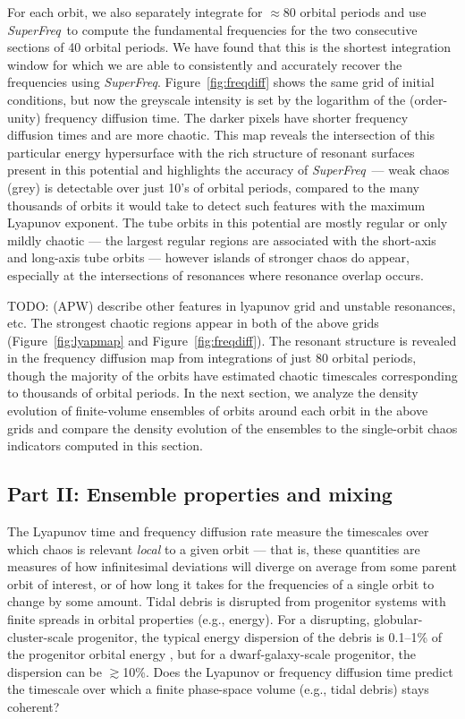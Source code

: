 \documentclass[letterpaper,12pt,preprint]{aastex}
\newcommand{\msun}{\ensuremath{\mathrm{M}_\odot}}
\newcommand{\project}[1]{\textsl{#1}}
\newcommand{\superfreq}{\project{SuperFreq}}
\newcommand{\todo}[2]{{\color{red} TODO: (\MakeUppercase{#1}) #2}}
\begin{document}
For each orbit, we also separately integrate for $\approx$80 orbital periods and use \superfreq\ to compute the fundamental frequencies for the two consecutive sections of 40 orbital periods. We have found that this is the shortest integration window for which we are able to consistently and accurately recover the frequencies using \superfreq. Figure~\ref{fig:freqdiff} shows the same grid of initial conditions, but now the greyscale intensity is set by the logarithm of the (order-unity) frequency diffusion time. The darker pixels have shorter frequency diffusion times and are more chaotic. This map reveals the intersection of this particular energy hypersurface with the rich structure of resonant surfaces present in this potential and highlights the accuracy of \superfreq\ --- weak chaos (grey) is detectable over just 10's of orbital periods, compared to the many thousands of orbits it would take to detect such features with the maximum Lyapunov exponent. The tube orbits in this potential are mostly regular or only mildly chaotic --- the largest regular regions are associated with the short-axis and long-axis tube orbits --- however islands of stronger chaos do appear, especially at the intersections of resonances where resonance overlap occurs. 

\todo{apw}{describe other features in lyapunov grid and unstable resonances, etc.}
The strongest chaotic regions appear in both of the above grids (Figure~\ref{fig:lyapmap} and Figure~\ref{fig:freqdiff}). The resonant structure is revealed in the frequency diffusion map from integrations of just 80 orbital periods, though the majority of the orbits have estimated chaotic timescales corresponding to thousands of orbital periods. In the next section, we analyze the density evolution of finite-volume ensembles of orbits around each orbit in the above grids and compare the density evolution of the ensembles to the single-orbit chaos indicators computed in this section.

\subsection{Part II: Ensemble properties and mixing} \label{sec:results2}

The Lyapunov time and frequency diffusion rate measure the timescales over which chaos is relevant \emph{local} to a given orbit --- that is, these quantities are measures of how infinitesimal deviations will diverge on average from some parent orbit of interest, or of how long it takes for the frequencies of a single orbit to change by some amount. Tidal debris is disrupted from progenitor systems with finite spreads in orbital properties (e.g., energy). For a disrupting, globular-cluster-scale progenitor, the typical energy dispersion of the debris is 0.1--1\% of the progenitor orbital energy \citep[assuming masses of $10^4$--$10^5$~\msun;][]{johnston98}, but for a dwarf-galaxy-scale progenitor, the dispersion can be $\gtrsim$10\%. Does the Lyapunov or frequency diffusion time predict the timescale over which a finite phase-space volume (e.g., tidal debris) stays coherent?
\end{document}
